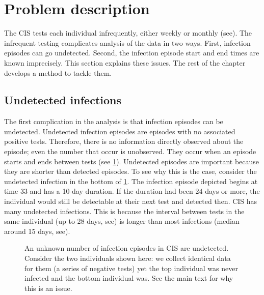\documentclass[thesis.tex]{subfiles}
\begin{document}
\section{Problem description} \label{perf-test:sec:problem}

The CIS tests each individual infrequently, either weekly or monthly (see).
The infrequent testing complicates analysis of the data in two ways.
First, infection episodes can go undetected.
Second, the infection episode start and end times are known imprecisely.
This section explains these issues. The rest of the chapter develops a method to tackle  them.

\subsection{Undetected infections}

The first complication in the analysis is that infection episodes can be undetected.
Undetected infection episodes are episodes with no associated positive tests.
Therefore, there is no information directly observed about the episode; even the number that occur is unobserved.
They occur when an episode starts and ends between tests (see \cref{perf-test:fig:truncation}).
Undetected episodes are important because they are shorter than detected episodes.
To see why this is the case, consider the undetected infection in the bottom of \cref{perf-test:fig:truncation}.
The infection episode depicted begins at time 33 and has a 10-day duration.
If the duration had been 24 days or more, the individual would still be detectable at their next test and detected then.
CIS has many undetected infections.
This is because the interval between tests in the same individual (up to 28 days, see) is longer than most infections (median around 15 days, see).
\begin{figure}
  \caption[Undetected episodes in CIS data]{An unknown number of infection episodes in CIS are undetected. Consider the two individuals shown here: we collect identical data for them (a series of negative tests) yet the top individual was never infected and the bottom individual was. See the main text for why this is an issue. \label{perf-test:fig:truncation}}
\end{figure}
\end{document}
